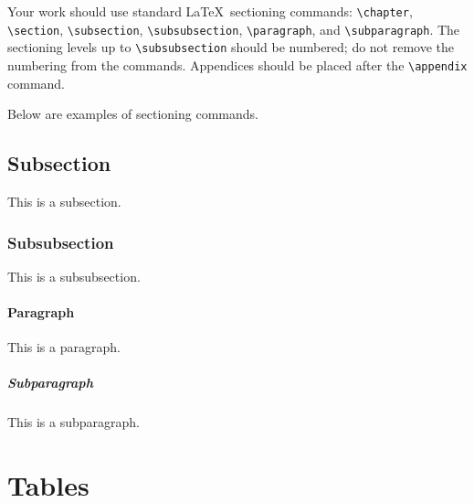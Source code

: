 Your work should use standard \LaTeX\ sectioning commands:
\verb|\chapter|, \verb|\section|, \verb|\subsection|, \verb|\subsubsection|,
\verb|\paragraph|, and \verb|\subparagraph|. The sectioning levels up to
\verb|\subsubsection| should be numbered; do not remove the numbering
from the commands. Appendices should be placed after the \verb|\appendix|
command.

Below are examples of sectioning commands.

\subsection{Subsection}
\label{sec:subsection}

This is a subsection.

\subsubsection{Subsubsection}
\label{sec:subsubsection}

This is a subsubsection.

\paragraph{Paragraph}

This is a paragraph.

\subparagraph{Subparagraph}

This is a subparagraph.

\section{Tables}

